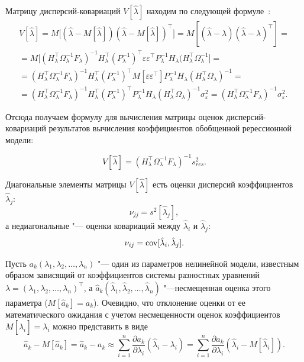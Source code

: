 Матрицу дисперсий-ковариаций $V[\hat{\lambda}]$ находим по следующей формуле~\cite{zot:1}:
\begin{multline}
V[\hat{\lambda}]=M\big[(\hat{\lambda}-M[\hat{\lambda}])(\hat{\lambda}-M[\hat{\lambda}])^{\top}\big]=M[(\hat{\lambda}-\lambda)(\hat{\lambda}-\lambda)^{\top}]=
\\
=M\big[(H_\lambda^{\top}\Omega_\lambda^{-1}F_\lambda)^{-1}H_\lambda^{\top}(P_\lambda^{-1})^{\top}\varepsilon\varepsilon^{\top}P_\lambda^{-1}H_\lambda(H_\lambda^{\top}\Omega_\lambda^{-1}\big]=
\\
=(H_\lambda^{\top}\Omega_\lambda^{-1}F_\lambda)^{-1}H_\lambda^{\top}(P_\lambda^{-1})^{\top}M[\varepsilon\varepsilon^{\top}]P_\lambda^{-1}H_\lambda(H_\lambda^{\top}\Omega_\lambda)^{-1}=
\\
=(H_\lambda^{\top}\Omega_\lambda^{-1}F_\lambda)^{-1}H_\lambda^{\top}(P_\lambda^{-1})^{\top}P_\lambda^{-1}H_\lambda(H_\lambda^{\top}\Omega_\lambda)^{-1}\sigma_\varepsilon^2=(H_\lambda^{\top}\Omega_\lambda^{-1}F_\lambda)^{-1}\sigma_\varepsilon^2.
\end{multline}

Отсюда получаем формулу для вычисления матрицы оценок дисперсий-ковариаций результатов вычисления коэффициентов обобщенной ререссионной модели:

\begin{equation}
V[\hat{\lambda}]=(H_\lambda^{\top}\Omega_\lambda^{-1}F_\lambda)^{-1}s_{res}^2.
\label{zoteev:eq47}
\end{equation}

Диагональные элементы матрицы $V[\hat{\lambda}]$ есть оценки дисперсий коэффициентов $\hat{\lambda}_j$: $$\nu_{jj}=s^2[\hat{\lambda}_j],$$ 
а недиагональные "--- оценки ковариаций между $\hat{\lambda}_i$ и $\hat{\lambda}_j$: 
$$\nu_{ij}=\mathop{\rm cov}[\hat{\lambda}_i,\hat{\lambda}_j].$$

Пусть  $a_k(\lambda_1,\lambda_2,\dots,\lambda_n)$ "--- один из параметров нелинейной модели, известным образом зависящий от коэффициентов системы разностных уравнений $\lambda=(\lambda_1,\lambda_2,\dots,\lambda_n)^{\top}$, а $\hat{a}_k(\hat{\lambda}_1,\hat{\lambda}_2,\dots,\hat{\lambda}_n)$  "---несмещенная оценка этого параметра ($M[\hat{a}_k]=a_k$). Очевидно, что отклонение оценки от ее математического ожидания с учетом несмещенности оценок коэффициентов $M[\hat{\lambda}_i]=\lambda_i$ можно представить в виде
$$\hat{a}_k-M[\hat{a}_k]=\hat{a}_k-a_k \approx \sum_{i=1}^n \dfrac{\partial a_k}{\partial \lambda_i}(\hat{\lambda}_i-\lambda_i)=\sum_{i=1}^n \dfrac{\partial a_k}{\partial \lambda_i}(\hat{\lambda}_i-M[\hat{\lambda}_i]).$$

